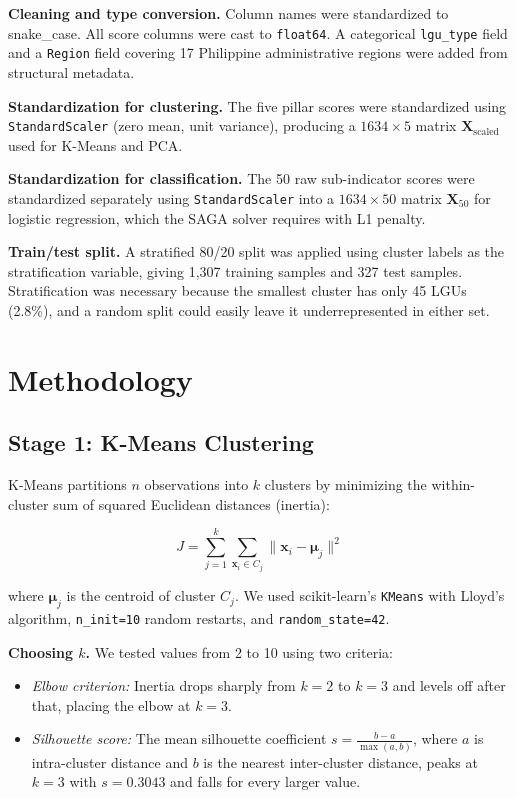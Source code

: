 \documentclass[conference]{IEEEtran}
\begin{document}
\textbf{Cleaning and type conversion.} Column names were standardized to snake\_case. All score columns were cast to \texttt{float64}. A categorical \texttt{lgu\_type} field and a \texttt{Region} field covering 17 Philippine administrative regions were added from structural metadata.

\textbf{Standardization for clustering.} The five pillar scores were standardized using \texttt{StandardScaler} (zero mean, unit variance), producing a $1634 \times 5$ matrix $\mathbf{X}_{\text{scaled}}$ used for K-Means and PCA.

\textbf{Standardization for classification.} The 50 raw sub-indicator scores were standardized separately using \texttt{StandardScaler} into a $1634 \times 50$ matrix $\mathbf{X}_{50}$ for logistic regression, which the SAGA solver requires with L1 penalty.

\textbf{Train/test split.} A stratified 80/20 split was applied using cluster labels as the stratification variable, giving 1,307 training samples and 327 test samples. Stratification was necessary because the smallest cluster has only 45 LGUs (2.8\%), and a random split could easily leave it underrepresented in either set.

\section{Methodology}
\label{sec:methods}

\subsection{Stage 1: K-Means Clustering}

K-Means partitions $n$ observations into $k$ clusters by minimizing the within-cluster sum of squared Euclidean distances (inertia):

\begin{equation}
    J = \sum_{j=1}^{k} \sum_{\mathbf{x}_i \in C_j} \|\mathbf{x}_i - \boldsymbol{\mu}_j\|^2
\end{equation}

where $\boldsymbol{\mu}_j$ is the centroid of cluster $C_j$. We used scikit-learn's \texttt{KMeans} with Lloyd's algorithm, \texttt{n\_init=10} random restarts, and \texttt{random\_state=42}.

\textbf{Choosing $k$.} We tested values from 2 to 10 using two criteria:

\begin{itemize}
    \item \textit{Elbow criterion:} Inertia drops sharply from $k{=}2$ to $k{=}3$ and levels off after that, placing the elbow at $k{=}3$.
    \item \textit{Silhouette score:} The mean silhouette coefficient $s = \frac{b - a}{\max(a, b)}$, where $a$ is intra-cluster distance and $b$ is the nearest inter-cluster distance, peaks at $k{=}3$ with $s{=}0.3043$ and falls for every larger value.
\end{itemize}
\end{document}

